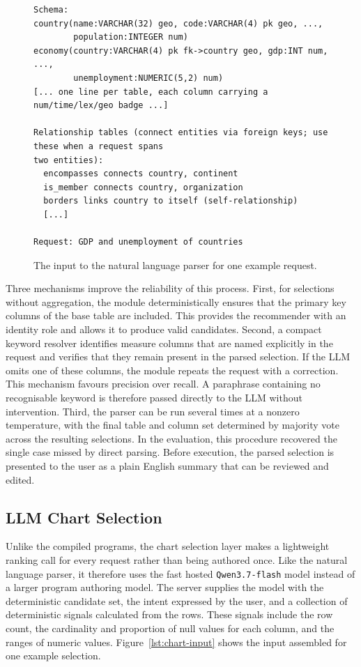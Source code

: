 \begin{figure}[htbp]
\begin{lstlisting}[style=prompt]
Schema:
country(name:VARCHAR(32) geo, code:VARCHAR(4) pk geo, ...,
        population:INTEGER num)
economy(country:VARCHAR(4) pk fk->country geo, gdp:INT num, ...,
        unemployment:NUMERIC(5,2) num)
[... one line per table, each column carrying a num/time/lex/geo badge ...]

Relationship tables (connect entities via foreign keys; use these when a request spans 
two entities):
  encompasses connects country, continent
  is_member connects country, organization
  borders links country to itself (self-relationship)
  [...]

Request: GDP and unemployment of countries

\end{lstlisting}
\caption{The input to the natural language parser for one example request.}
\label{lst:nl-input}
\end{figure}

Three mechanisms improve the reliability of this process. First, for selections without aggregation, the module deterministically ensures that the primary key columns of the base table are included. This provides the recommender with an identity role and allows it to produce valid candidates. Second, a compact keyword resolver identifies measure columns that are named explicitly in the request and verifies that they remain present in the parsed selection. If the LLM omits one of these columns, the module repeats the request with a correction. This mechanism favours precision over recall. A paraphrase containing no recognisable keyword is therefore passed directly to the LLM without intervention. Third, the parser can be run several times at a nonzero temperature, with the final table and column set determined by majority vote across the resulting selections. In the evaluation, this procedure recovered the single case missed by direct parsing. Before execution, the parsed selection is presented to the user as a plain English summary that can be reviewed and edited.


\subsection{LLM Chart Selection}
\label{sec:impl-llm-select}

Unlike the compiled programs, the chart selection layer makes a lightweight ranking call for every request rather than being authored once. Like the natural language parser, it therefore uses the fast hosted \texttt{Qwen3.7-flash} model instead of a larger program authoring model. The server supplies the model with the deterministic candidate set, the intent expressed by the user, and a collection of deterministic signals calculated from the rows. These signals include the row count, the cardinality and proportion of null values for each column, and the ranges of numeric values. Figure~\ref{lst:chart-input} shows the input assembled for one example selection.

